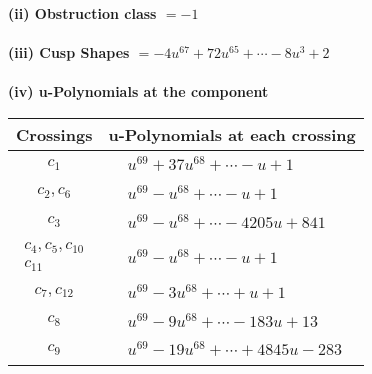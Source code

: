 \documentclass[1p]{elsarticle_modified}
\theoremstyle{definition}
\begin{document}
\flushleft \textbf{(ii) Obstruction class $= -1$}\\~\\
\flushleft \textbf{(iii) Cusp Shapes $= -4 u^{67}+72 u^{65}+\cdots-8 u^3+2$}\\~\\
\newpage\renewcommand{\arraystretch}{1}
\flushleft \textbf{(iv) u-Polynomials at the component}\newline \\
\begin{tabular}{m{50pt}|m{274pt}}
Crossings & \hspace{64pt}u-Polynomials at each crossing \\
\hline $$\begin{aligned}c_{1}\end{aligned}$$&$\begin{aligned}
&u^{69}+37 u^{68}+\cdots- u+1
\end{aligned}$\\
\hline $$\begin{aligned}c_{2},c_{6}\end{aligned}$$&$\begin{aligned}
&u^{69}- u^{68}+\cdots- u+1
\end{aligned}$\\
\hline $$\begin{aligned}c_{3}\end{aligned}$$&$\begin{aligned}
&u^{69}- u^{68}+\cdots-4205 u+841
\end{aligned}$\\
\hline $$\begin{aligned}c_{4},c_{5},c_{10}\\c_{11}\end{aligned}$$&$\begin{aligned}
&u^{69}- u^{68}+\cdots- u+1
\end{aligned}$\\
\hline $$\begin{aligned}c_{7},c_{12}\end{aligned}$$&$\begin{aligned}
&u^{69}-3 u^{68}+\cdots+u+1
\end{aligned}$\\
\hline $$\begin{aligned}c_{8}\end{aligned}$$&$\begin{aligned}
&u^{69}-9 u^{68}+\cdots-183 u+13
\end{aligned}$\\
\hline $$\begin{aligned}c_{9}\end{aligned}$$&$\begin{aligned}
&u^{69}-19 u^{68}+\cdots+4845 u-283
\end{aligned}$\\
\hline
\end{tabular}\\~\\
\end{document}
